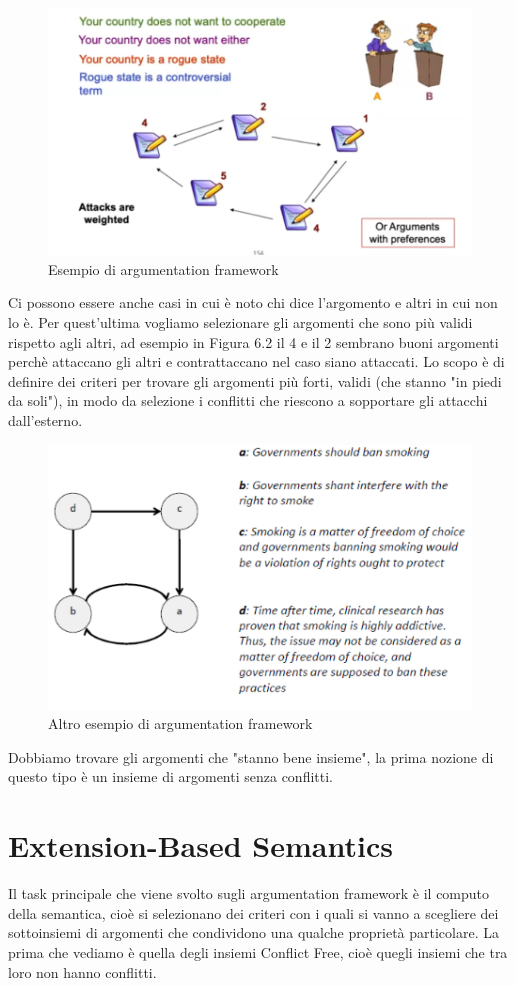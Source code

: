 \begin{figure}[htp]
	\centering
    \includegraphics[width=12cm, keepaspectratio]{img/Cap6/arg2.png}
    \caption{Esempio di argumentation framework}
\end{figure}
Ci possono essere anche casi in cui è noto chi dice l’argomento e altri in cui non lo è. Per quest’ultima vogliamo selezionare gli argomenti che sono più validi rispetto agli altri, ad esempio in Figura 6.2 il 4 e il 2 sembrano buoni argomenti perchè attaccano gli altri e contrattaccano nel caso siano attaccati. Lo scopo è di definire dei criteri per trovare gli argomenti più forti, validi (che stanno "in piedi da soli"), in modo da selezione i conflitti che riescono a sopportare gli attacchi dall’esterno.
\begin{figure}[htp]
	\centering
    \includegraphics[width=12cm, keepaspectratio]{img/Cap6/arg3.png}
    \caption{Altro esempio di argumentation framework}
\end{figure}
Dobbiamo trovare gli argomenti che "stanno bene insieme", la prima nozione di questo tipo è un insieme di argomenti senza conflitti.

\section{Extension-Based Semantics}
Il task principale che viene svolto sugli argumentation framework è il computo della semantica, cioè si selezionano dei criteri con i quali si vanno a scegliere dei sottoinsiemi di argomenti che condividono una qualche proprietà particolare. La prima che vediamo è quella degli insiemi Conflict Free, cioè quegli insiemi che tra loro non hanno conflitti.
